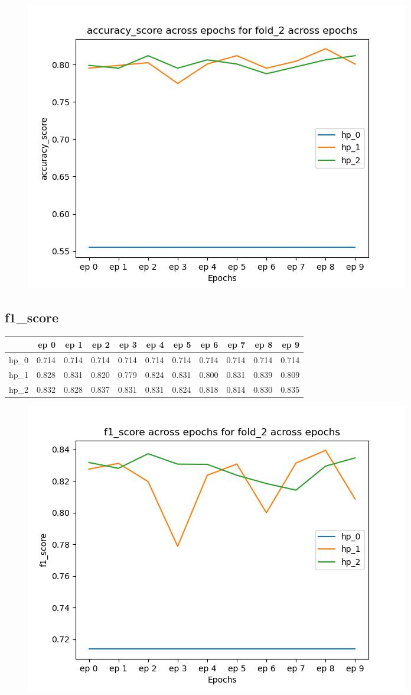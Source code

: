 \documentclass{article}
\begin{document}
\begin{figure}[H]
\includegraphics[scale = 0.75]{fold_2/accuracy_score}
\end{figure}
\subsection{f1\_score}
\begin{tabular}{lrrrrrrrrrr}
\toprule
{} &   ep 0 &   ep 1 &   ep 2 &   ep 3 &   ep 4 &   ep 5 &   ep 6 &   ep 7 &   ep 8 &   ep 9 \\
\midrule
hp\_0 &  0.714 &  0.714 &  0.714 &  0.714 &  0.714 &  0.714 &  0.714 &  0.714 &  0.714 &  0.714 \\
hp\_1 &  0.828 &  0.831 &  0.820 &  0.779 &  0.824 &  0.831 &  0.800 &  0.831 &  0.839 &  0.809 \\
hp\_2 &  0.832 &  0.828 &  0.837 &  0.831 &  0.831 &  0.824 &  0.818 &  0.814 &  0.830 &  0.835 \\
\bottomrule
\end{tabular}

\begin{figure}[H]
\includegraphics[scale = 0.75]{fold_2/f1_score}
\end{figure}
\end{document}
